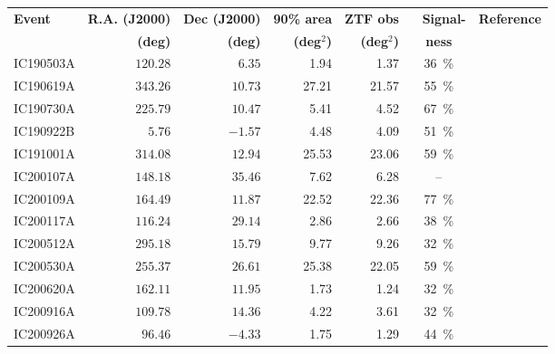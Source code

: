 \appendix

\begin{table*}
\centering
\small
    \begin{tabular}{l r r r r c c} 
        \textbf{Event} & \textbf{R.A. (J2000)} & \textbf{Dec (J2000)} & \textbf{90\% area} & \textbf{ZTF obs} &~ \textbf{Signal-}& \textbf{Reference}\\
        & \textbf{(deg)}&\textbf{(deg)}& \textbf{(deg$^{2}$)}& \textbf{(deg$^{2}$)} & \textbf{ness} &\\
        \hline
        IC190503A & $120.28$ & $6.35$ & 1.94 & 1.37 & \SI{36}{\percent}&\cite{IC190503A1, IC190503A2}\\
        IC190619A & $343.26$ & $10.73$ & 27.21 & 21.57 & \SI{55}{\percent}&\cite{IC190619A1, IC190619A2}\\
        IC190730A & $225.79$ & $10.47$ & 5.41 & 4.52 & \SI{67}{\percent}&\cite{IC190730A1, IC190730A2}\\
        IC190922B & $5.76$ & $-1.57$ & 4.48 & 4.09 & \SI{51}{\percent}&\cite{IC190922B1, IC190922B2, IC190922B3}\\
        IC191001A & $314.08$ & $12.94$ & 25.53 & 23.06 & \SI{59}{\percent}& \cite{IC191001A1, IC191001A2, IC191001A3}\\
        IC200107A & $148.18$ & $35.46$ & 7.62 & 6.28 & -- &\cite{IC200107A1, IC200107A2}\\
        IC200109A & $164.49$ & $11.87$ & 22.52 & 22.36 & \SI{77}{\percent}&\cite{IC200109A1, IC200109A2}\\
        IC200117A & $116.24$ & $29.14$ & 2.86 &  2.66 & \SI{38}{\percent}&\cite{IC200117A1, IC200117A2, IC200117A3}\\
        IC200512A & $295.18$ & $15.79$ & 9.77 &  9.26 & \SI{32}{\percent}&\cite{IC200512A1, IC200512A2}\\
        IC200530A & $255.37$ & $26.61$ & 25.38 & 22.05 & \SI{59}{\percent}&\cite{IC200530A1, IC200530A2, IC200530A3, IC200530A4}\\
        IC200620A & $162.11$ & $11.95$ & 1.73 & 1.24 & \SI{32}{\percent}&\cite{IC200620A1, IC200620A2}\\
        IC200916A & $109.78$ & $14.36$ & 4.22 & 3.61 & \SI{32}{\percent}&\cite{IC200916A1, IC200916A2, IC200916A3}\\
        IC200926A & $96.46$ & $-4.33$ & 1.75 & 1.29 & \SI{44}{\percent}&\cite{IC200926A1, IC200926A2}\\

\end{tabular}
\end{table*}
